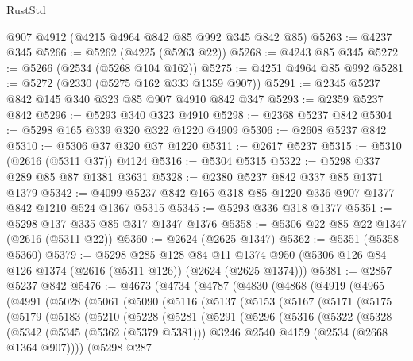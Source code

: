 \begin{lexlean}{RustStd}
\begin{coremodule}
    @907
    @4912
    (@4215 @4964 @842 @85 @992 @345 @842 @85)
@5263 := @4237 @345
@5266 := @5262 (@4225 (@5263 @22))
@5268 := @4243 @85 @345
@5272 := @5266 (@2534 (@5268 @104 @162))
@5275 := @4251 @4964 @85 @992
@5281 := @5272 (@2330 (@5275 @162 @333 @1359 @907))
@5291 := @2345 @5237 @842 @145 @340 @323 @85 @907 @4910 @842 @347
@5293 := @2359 @5237 @842
@5296 := @5293 @340 @323 @4910
@5298 := @2368 @5237 @842
@5304 := @5298 @165 @339 @320 @322 @1220 @4909
@5306 := @2608 @5237 @842
@5310 := @5306 @37 @320 @37 @1220
@5311 := @2617 @5237
@5315 := @5310 (@2616 (@5311 @37)) @4124
@5316 := @5304 @5315
@5322 := @5298 @337 @289 @85 @87 @1381 @3631
@5328 := @2380 @5237 @842 @337 @85 @1371 @1379
@5342 := @4099 @5237 @842 @165 @318 @85 @1220 @336 @907 @1377 @842 @1210 @524 @1367 @5315
@5345 := @5293 @336 @318 @1377
@5351 := @5298 @137 @335 @85 @317 @1347 @1376
@5358 := @5306 @22 @85 @22 @1347 (@2616 (@5311 @22))
@5360 := @2624 (@2625 @1347)
@5362 := @5351 (@5358 @5360)
@5379 := @5298
    @285
    @128
    @84
    @11
    @1374
    @950
    (@5306 @126 @84 @126 @1374 (@2616 (@5311 @126)) (@2624 (@2625 @1374)))
@5381 := @2857 @5237 @842
@5476 := @4673
    (@4734
      (@4787
        (@4830
          (@4868
            (@4919
              (@4965
                (@4991
                  (@5028
                    (@5061
                      (@5090
                        (@5116
                          (@5137
                            (@5153
                              (@5167
                                (@5171
                                  (@5175
                                    (@5179
                                      (@5183
                                        (@5210
                                          (@5228
                                            (@5281
                                              (@5291
                                                (@5296
                                                  (@5316
                                                    (@5322
                                                      (@5328
                                                        (@5342
                                                          (@5345 (@5362 (@5379 @5381)))
                                                          @3246
                                                          @2540
                                                          @4159
                                                          (@2534 (@2668 @1364 @907))))
                                                      (@5298
                                                        @287

\end{coremodule}
\end{lexlean}
